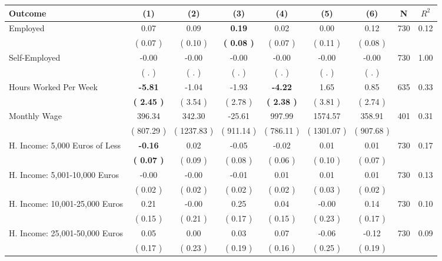 \begin{tabular}{lcccccccc}
\toprule
 \textbf{Outcome} & \textbf{(1)} & \textbf{(2)} & \textbf{(3)} & \textbf{(4)} & \textbf{(5)} & \textbf{(6)} & \textbf{N} & \textbf{$ R^2$} \\
\midrule
Employed &      0.07 &      0.09 & \textbf{     0.19} &      0.02 &      0.00 &      0.12 & 730 &       0.12 \\ 
 & (     0.07 ) & (     0.10 ) & \textbf{(     0.08 )} & (     0.07 ) & (     0.11 ) & (     0.08 ) & \\
Self-Employed &     -0.00 &     -0.00 &     -0.00 &     -0.00 &     -0.00 &     -0.00 & 730 &       1.00 \\ 
 & (        . ) & (        . ) & (        . ) & (        . ) & (        . ) & (        . ) & \\
Hours Worked Per Week & \textbf{    -5.81} &     -1.04 &     -1.93 & \textbf{    -4.22} &      1.65 &      0.85 & 635 &       0.33 \\ 
 & \textbf{(     2.45 )} & (     3.54 ) & (     2.78 ) & \textbf{(     2.38 )} & (     3.81 ) & (     2.74 ) & \\
Monthly Wage &    396.34 &    342.30 &    -25.61 &    997.99 &   1574.57 &    358.91 & 401 &       0.31 \\ 
 & (   807.29 ) & (  1237.83 ) & (   911.14 ) & (   786.11 ) & (  1301.07 ) & (   907.68 ) & \\
H. Income: 5,000 Euros of Less & \textbf{    -0.16} &      0.02 &     -0.05 &     -0.02 &      0.01 &      0.01 & 730 &       0.17 \\ 
 & \textbf{(     0.07 )} & (     0.09 ) & (     0.08 ) & (     0.06 ) & (     0.10 ) & (     0.07 ) & \\
H. Income: 5,001-10,000 Euros &     -0.00 &     -0.00 &     -0.01 &      0.01 &      0.01 &      0.01 & 730 &       0.13 \\ 
 & (     0.02 ) & (     0.02 ) & (     0.02 ) & (     0.02 ) & (     0.03 ) & (     0.02 ) & \\
H. Income: 10,001-25,000 Euros &      0.21 &     -0.00 &      0.25 &      0.04 &     -0.00 &      0.14 & 730 &       0.10 \\ 
 & (     0.15 ) & (     0.21 ) & (     0.17 ) & (     0.15 ) & (     0.23 ) & (     0.17 ) & \\
H. Income: 25,001-50,000 Euros &      0.05 &      0.00 &      0.03 &      0.07 &     -0.06 &     -0.12 & 730 &       0.09 \\ 
 & (     0.17 ) & (     0.23 ) & (     0.19 ) & (     0.16 ) & (     0.25 ) & (     0.19 ) & \\

\end{tabular}
